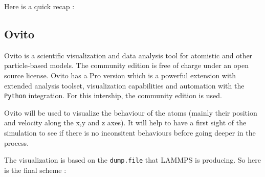         Here is a quick recap : 

        \begin{center}
            \captionsetup{type=figure}
        \end{center}

    \subsection{Ovito}
        
        Ovito is a scientific visualization and data analysis tool for atomistic and other particle-based models. The community edition is free of charge under an open source license. Ovito has a Pro version which is a powerful extension with extended analysis toolset, visualization capabilities and automation with the \verb|Python| integration. For this intership, the community edition is used. \medskip

        Ovito will be used to visualize the behaviour of the atoms (mainly their position and velocity along the x,y and z axes). It will help to have a first sight of the simulation to see if there is no inconsitent behaviours before going deeper in the process.

        The visualization is based on the \verb|dump.file| that LAMMPS is producing. So here is the final scheme : 

        \begin{center}
            \captionsetup{type=figure}
        \end{center}
    
